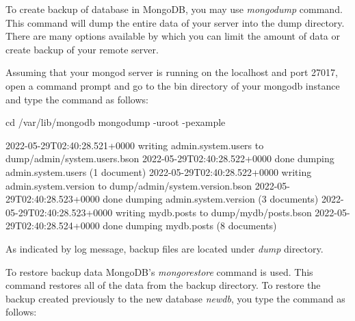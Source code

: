 \documentclass[12pt]{article}
\begin{document}
\begin{bashcode}
\begin{bashcode}
To create backup of database in MongoDB, you may use \emph{mongodump}
command. This command will dump the entire data of your server into the
dump directory. There are many options available by which you can limit
the amount of data or create backup of your remote server.

Assuming that your mongod server is running on the localhost and port
27017, open a command prompt and go to the bin directory of your mongodb
instance and type the command as follows:

\begin{bashcode}
cd /var/lib/mongodb
mongodump -uroot -pexample

2022-05-29T02:40:28.521+0000    writing admin.system.users to dump/admin/system.users.bson
2022-05-29T02:40:28.522+0000    done dumping admin.system.users (1 document)
2022-05-29T02:40:28.522+0000    writing admin.system.version to dump/admin/system.version.bson
2022-05-29T02:40:28.523+0000    done dumping admin.system.version (3 documents)
2022-05-29T02:40:28.523+0000    writing mydb.posts to dump/mydb/posts.bson
2022-05-29T02:40:28.524+0000    done dumping mydb.posts (8 documents)
\end{bashcode}

As indicated by log message, backup files are located under \emph{dump}
directory.


To restore backup data MongoDB's \emph{mongorestore} command is used.
This command restores all of the data from the backup directory. To
restore the backup created previously to the new database \emph{newdb},
you type the command as follows:


\end{bashcode}
\end{bashcode}
\end{document}
